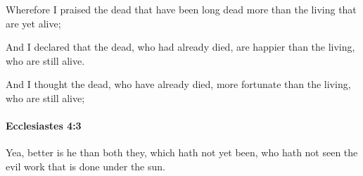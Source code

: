 			\begin{versebox}
					\item[BHS] 
					\item[LXX] 
					\item[ASV] Wherefore I praised the dead that have been long dead more than the living that are yet alive;
					\item[NIV] And I declared that the dead, who had already died, are happier than the living, who are still alive.
					\item[NRSV] And I thought the dead, who have already died, more fortunate than the living, who are still alive;
			\end{versebox}

		\paragraph{Ecclesiastes 4:3} %
			\label{ECCLESIASTES-4-3}

			Yea, better is he than both they, which hath not yet been, who hath not seen the evil work that is done under the sun.

